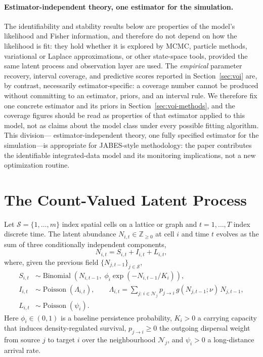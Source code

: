 \documentclass[preprint,12pt]{elsarticle}
\theoremstyle{definition}
\newcommand{\Pois}{\operatorname{Poisson}}
\newcommand{\Bin}{\operatorname{Binomial}}
\renewcommand{\S}{\mathcal{S}}
\begin{document}
\paragraph{Estimator-independent theory, one estimator for the simulation.}
The identifiability and stability results below are properties of the model's
likelihood and Fisher information, and therefore do not depend on how the
likelihood is fit: they hold whether it is explored by MCMC, particle methods,
variational or Laplace approximations, or other state-space tools, provided the
same latent process and observation layer are used. The \emph{empirical}
parameter recovery, interval coverage, and predictive scores reported in
Section~\ref{sec:voi} are, by contrast, necessarily estimator-specific: a
coverage number cannot be produced without committing to an estimator, priors,
and an interval rule. We therefore fix one concrete estimator and its priors in
Section~\ref{sec:voi-methods}, and the coverage figures should be read as
properties of that estimator applied to this model, not as claims about the
model class under every possible fitting algorithm. This division---
estimator-independent theory, one fully specified estimator for the
simulation---is appropriate for JABES-style methodology: the paper contributes
the identifiable integrated-data model and its monitoring implications, not a
new optimization routine.

\section{The Count-Valued Latent Process}
\label{sec:process}

Let $\S=\{1,\ldots,m\}$ index spatial cells on a lattice or graph and
$t=1,\ldots,T$ index discrete time. The latent abundance
$N_{i,t}\in\mathbb{Z}_{\ge0}$ at cell $i$ and time $t$ evolves as the sum of
three conditionally independent components,
\begin{equation}
  N_{i,t}=S_{i,t}+I_{i,t}+L_{i,t},
  \label{eq:decomp}
\end{equation}
where, given the previous field $\{N_{j,t-1}\}_{j\in\S}$,
\begin{align}
  S_{i,t}
  &\sim\Bin\!\left(N_{i,t-1},\;
    \phi_i\exp(-N_{i,t-1}/K_i)\right),
  \label{eq:survival}\\
  I_{i,t}
  &\sim\Pois(\Lambda_{i,t}),\qquad
  \Lambda_{i,t}=\sum_{j:\,i\in\mathcal{N}_j}
    p_{j\to i}\,g(N_{j,t-1};\nu)\,N_{j,t-1},
  \label{eq:immigration}\\
  L_{i,t}
  &\sim\Pois(\psi_i).
  \label{eq:ldd}
\end{align}
Here $\phi_i\in(0,1)$ is a baseline persistence probability, $K_i>0$ a
carrying capacity that induces density-regulated survival, $p_{j\to i}\ge0$
the outgoing dispersal weight from source $j$ to target $i$ over the
neighbourhood $\mathcal{N}_j$, and $\psi_i>0$ a long-distance arrival rate.
\end{document}
